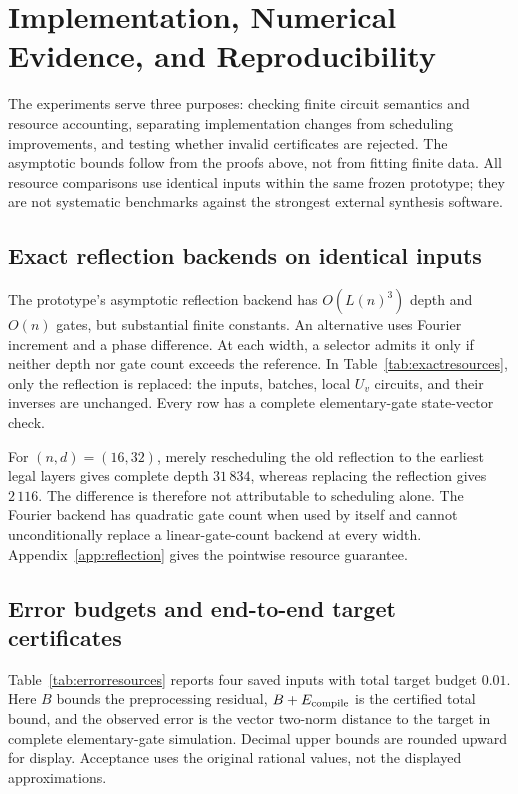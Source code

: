 \section{Implementation, Numerical Evidence, and Reproducibility}\label{sec:experiments}
The experiments serve three purposes: checking finite circuit semantics and resource accounting, separating implementation changes from scheduling improvements, and testing whether invalid certificates are rejected. The asymptotic bounds follow from the proofs above, not from fitting finite data. All resource comparisons use identical inputs within the same frozen prototype; they are not systematic benchmarks against the strongest external synthesis software.

\subsection{Exact reflection backends on identical inputs}
The prototype's asymptotic reflection backend has $O(L(n)^3)$ depth and $O(n)$ gates, but substantial finite constants. An alternative uses Fourier increment and a phase difference. At each width, a selector admits it only if neither depth nor gate count exceeds the reference. In Table~\ref{tab:exactresources}, only the reflection is replaced: the inputs, batches, local $U_v$ circuits, and their inverses are unchanged. Every row has a complete elementary-gate state-vector check.


For $(n,d)=(16,32)$, merely rescheduling the old reflection to the earliest legal layers gives complete depth $31\,834$, whereas replacing the reflection gives $2\,116$. The difference is therefore not attributable to scheduling alone. The Fourier backend has quadratic gate count when used by itself and cannot unconditionally replace a linear-gate-count backend at every width. Appendix~\ref{app:reflection} gives the pointwise resource guarantee.

\subsection{Error budgets and end-to-end target certificates}
Table~\ref{tab:errorresources} reports four saved inputs with total target budget $0.01$. Here $B$ bounds the preprocessing residual, $B+E_{\rm compile}$ is the certified total bound, and the observed error is the vector two-norm distance to the target in complete elementary-gate simulation. Decimal upper bounds are rounded upward for display. Acceptance uses the original rational values, not the displayed approximations.


